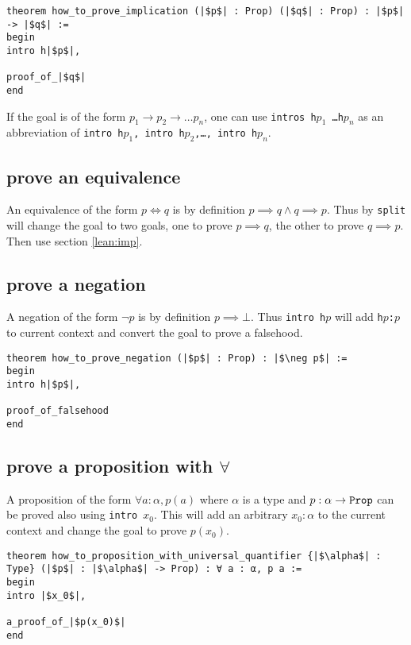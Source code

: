 \documentclass{report}
\theoremstyle{definition}
\theoremstyle{plain}
\begin{document}
\begin{verbatim}
theorem how_to_prove_implication (|$p$| : Prop) (|$q$| : Prop) : |$p$| -> |$q$| :=
begin
intro h|$p$|,
  
proof_of_|$q$|
end
\end{verbatim}

If the goal is of the form $p_1\to p_2\to\dots p_n$, one can use {\tt intros h$p_1$ \dots h$p_n$} as an abbreviation of {\tt intro h$p_1$, intro h$p_2$,\dots, intro h$p_n$}.


\subsection{prove an equivalence}\label{lean:eqv}
An equivalence of the form $p \iff q$ is by definition $p\implies q \land q\implies p$. Thus by {\tt split} will change the goal to two goals, one to prove $p\implies q$, the other to prove $q \implies p$. Then use section \ref{lean:imp}.

\subsection{prove a negation}
A negation of the form $\neg p$ is by definition $p \implies \bot$. Thus {\tt intro h$p$} will add {\tt h$p$:$p$} to current context and convert the goal to prove a falsehood.

\begin{verbatim}
theorem how_to_prove_negation (|$p$| : Prop) : |$\neg p$| :=
begin
intro h|$p$|,

proof_of_falsehood
end
\end{verbatim}

\subsection{prove a proposition with $\forall$}\label{lean:forall}
A proposition of the form $\forall a : \alpha, p(a)$ where $\alpha$ is a type and $p : \alpha\to {\tt Prop}$ can be proved also using {\tt intro $x_0$}. This will add an arbitrary $x_0:\alpha$ to the current context and change the goal to prove $p(x_0)$.

\begin{verbatim}
theorem how_to_proposition_with_universal_quantifier {|$\alpha$| : Type} (|$p$| : |$\alpha$| -> Prop) : ∀ a : α, p a :=
begin
intro |$x_0$|,

a_proof_of_|$p(x_0)$|
end
\end{verbatim}
\end{document}
